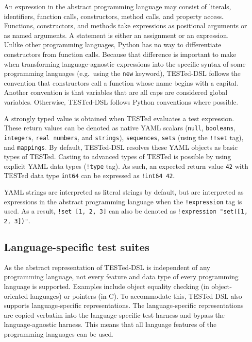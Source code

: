 \documentclass[../main]{subfiles}
\begin{document}
An expression in the abstract programming language may consist of literals, identifiers, function calls, constructors, method calls, and property access.
Functions, constructors, and methods take expressions as positional arguments or as named arguments.
A statement is either an assignment or an expression.
Unlike other programming languages, Python has no way to differentiate constructors from function calls.
Because that difference is important to make when transforming language-agnostic expressions into the specific syntax of some programming languages (e.g.\ using the \texttt{new} keyword), TESTed-DSL follows the convention that constructors call a function whose name begins with a capital.
Another convention is that variables that are all caps are considered global variables.
Otherwise, TESTed-DSL follows Python conventions where possible.

A strongly typed value is obtained when TESTed evaluates a test expression.
These return values can be denoted as native YAML scalars (\texttt{null}, \texttt{booleans}, \texttt{integers}, \texttt{real numbers}, and \texttt{strings}), \texttt{sequences}, \texttt{sets} (using the \texttt{!!set} tag), and \texttt{mappings}.
By default, TESTed-DSL resolves these YAML objects as basic types of TESTed.
Casting to advanced types of TESTed is possible by using explicit YAML data types (\texttt{!type} tag).
As such, an expected return value \texttt{42} with TESTed data type \texttt{int64} can be expressed as \texttt{!int64 42}.

YAML strings are interpreted as literal strings by default, but are interpreted as expressions in the abstract programming language when the \texttt{!expression} tag is used.
As a result, \texttt{!set [1, 2, 3]} can also be denoted as \texttt{!expression "set([1, 2, 3])"}.

\subsection{Language-specific test suites}\label{subsec:dsl-language-specific-test-suites}

As the abstract representation of TESTed-DSL is independent of any programming language, not every feature and data type of every programming language is supported.
Examples include object equality checking (in object-oriented languages) or pointers (in C).
To accommodate this, TESTed-DSL also supports language-specific representations.
The language-specific representations are copied verbatim into the language-specific test harness and bypass the language-agnostic harness.
This means that all language features of the programming languages can be used.
\end{document}
